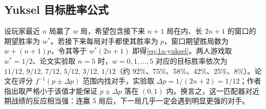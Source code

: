 \subsection{Yuksel 目标胜率公式}\label{app:ch1a-yuksel}

设玩家最近 $n$ 局赢了 $w$ 局，希望包含接下来 $n+1$ 局在内、长 $2n+1$ 的窗口的期望胜率为 $w^*$。若接下来每局对手都使其胜率为 $p$，窗口期望胜局数为 $w+(n+1)p$，令其等于 $w^*(2n+1)$ 即得\cref{eq:1a-yuksel}。两人游戏取 $w^*=1/2$、论文实验取 $n=5$ 时，$w=0,1,\dots,5$ 对应的目标胜率依次为 $11/12,\,9/12,\,7/12,\,5/12,\,3/12,\,1/12$（约 92\%、75\%、58\%、42\%、25\%、8\%）\tagOwn。论文在评分 $f^{-1}(p\pm\Delta p)$ 范围内找对手，实验取 $\Delta p=1/(2n+2)=1/12$；作者指出取严格小于该值才能保证 $p\pm\Delta p$ 落在 $(0,1)$ 内\cite{yuksel2024skill}。换言之，这一匹配器对近期战绩的反应相当强：连赢 5 局后，下一局几乎一定会遇到明显更强的对手。
